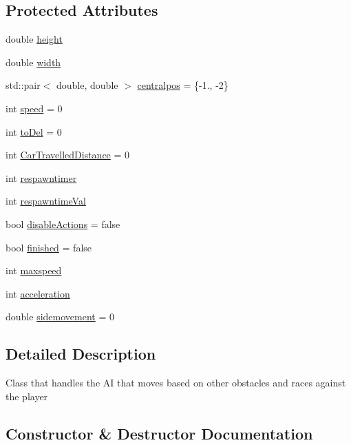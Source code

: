 \subsection*{Protected Attributes}
\begin{DoxyCompactItemize}
\item 
double \hyperlink{classroadfighter_1_1AIRacer_ae05aeeb75376978119b8dacb3a1416a9}{height}
\item 
double \hyperlink{classroadfighter_1_1AIRacer_afb07abbbb10e4d80202390fd940155b1}{width}
\item 
std\+::pair$<$ double, double $>$ \hyperlink{classroadfighter_1_1AIRacer_a3acb0b4859882716e2d1f2732b21a76e}{centralpos} = \{-\/1., -\/2\}
\item 
int \hyperlink{classroadfighter_1_1AIRacer_a37f6706ba77522ae4efe782da0125062}{speed} = 0
\item 
int \hyperlink{classroadfighter_1_1AIRacer_a7cfbfadf56859ab7865dd080376471c0}{to\+Del} = 0
\item 
int \hyperlink{classroadfighter_1_1AIRacer_a789b1e673e527b791854fe63dce6a963}{Car\+Travelled\+Distance} = 0
\item 
int \hyperlink{classroadfighter_1_1AIRacer_a6b68bb16afb117fce192974c3c044493}{respawntimer}
\item 
int \hyperlink{classroadfighter_1_1AIRacer_af072697ba6c72e186fe67a197caf2783}{respawntime\+Val}
\item 
bool \hyperlink{classroadfighter_1_1AIRacer_a5e5286d19035bc286ef10615bb512dd2}{disable\+Actions} = false
\item 
bool \hyperlink{classroadfighter_1_1AIRacer_a67ebabb7866c75cd75568e1e416c53c9}{finished} = false
\item 
int \hyperlink{classroadfighter_1_1AIRacer_ac997e50a6d864a1bbd4c513748f92836}{maxspeed}
\item 
int \hyperlink{classroadfighter_1_1AIRacer_a2e427cf40da5bde2d5aa30406bb649e1}{acceleration}
\item 
double \hyperlink{classroadfighter_1_1AIRacer_a79095fd3559c3930d6433ea2d92c35b9}{sidemovement} = 0
\end{DoxyCompactItemize}


\subsection{Detailed Description}
Class that handles the AI that moves based on other obstacles and races against the player 

\subsection{Constructor \& Destructor Documentation}
\mbox{\label{classroadfighter_1_1AIRacer_a81234077ec46f9824600f3aeb853d4d1}} 
